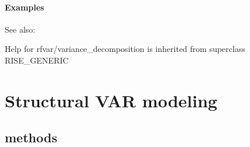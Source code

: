 \documentclass[letterpaper,10pt,english]{sphinxmanual}
\begin{document}
\subsubsection{Examples}
\label{classes/models/@rfvar/rfvar:id165}
See also:

Help for rfvar/variance\_decomposition is inherited from superclass RISE\_GENERIC


\chapter{Structural VAR modeling}
\label{classes/models/@svar/svar:structural-var-modeling}\label{classes/models/@svar/svar::doc}

\section{methods}
\end{document}
